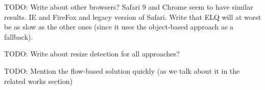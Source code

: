 \documentclass{acm_proc_article-sp}
\newcommand{\elq}{ELQ}
\begin{document}
    TODO: Write about other browsers? Safari 9 and Chrome seem to have similar results. IE and FireFox and legacy version of Safari. Write that \elq{} will at worst be as slow as the other ones (since it uses the object-based approach as a fallback).

    TODO: Write about resize detection for all approaches?

    TODO: Mention the flow-based solution quickly (as we talk about it in the related works section)

\end{document}
